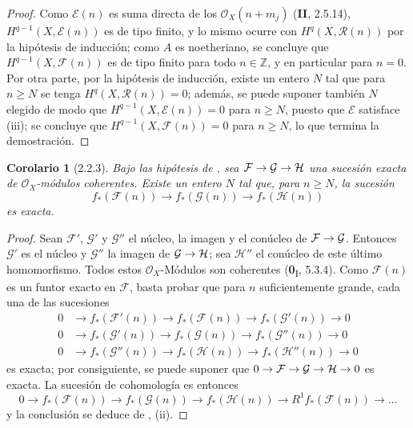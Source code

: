 \documentclass[10pt,oneside,openany]{book}
\theoremstyle{egaenv}\newtheorem*{env}{---}
\theoremstyle{egastatement}
\newtheorem*{corollary}{Corolario}
\theoremstyle{egadescription}
\renewcommand{\geq}{\geqslant}
\renewcommand{\to}{\mathchoice{\longrightarrow}{\rightarrow}{\rightarrow}{\rightarrow}}
\begin{document}
\begin{proof}
Como $\mathcal E(n)$ es suma directa de los $\mathcal O_X(n+m_j)$ (\textbf{II}, 2.5.14), $H^{q-1}(X,\mathcal E(n))$ es de tipo finito, y lo mismo ocurre con $H^q(X,\mathcal R(n))$ por la hipótesis de inducción; como $A$ es noetheriano, se concluye que $H^{q-1}(X,\mathcal F(n))$ es de tipo finito para todo $n\in\mathbb Z$, y en particular para $n=0$. Por otra parte, por la hipótesis de inducción, existe un entero $N$ tal que para $n\geq N$ se tenga $H^q(X,\mathcal R(n))=0$; además, se puede suponer también $N$ elegido de modo que $H^{q-1}(X,\mathcal E(n))=0$ para $n\geq N$, puesto que $\mathcal E$ satisface (iii); se concluye que $H^{q-1}(X,\mathcal F(n))=0$ para $n\geq N$, lo que termina la demostración.
\end{proof}

\begin{corollary}[2.2.3]
\label{III.2.2.3}
\label{III.2.2.3-fr}
Bajo las hipótesis de \textup{}, sea
$\mathcal F\to\mathcal G\to\mathcal H$
una sucesión exacta de $\mathcal O_X$-módulos coherentes.
Existe un entero $N$ tal que, para $n\geq N$, la sucesión
\[
f_*(\mathcal F(n))\longrightarrow f_*(\mathcal G(n))
\longrightarrow f_*(\mathcal H(n))
\]
es exacta.
\end{corollary}

\begin{proof}
Sean $\mathcal F'$, $\mathcal G'$ y $\mathcal G''$ el núcleo, la imagen y el conúcleo de $\mathcal F\to\mathcal G$.
Entonces $\mathcal G'$ es el núcleo y $\mathcal G''$ la imagen de $\mathcal G\to\mathcal H$; sea $\mathcal H''$ el conúcleo de este último homomorfismo.
Todos estos $\mathcal O_X$-Módulos son
coherentes (\textbf{0}\textsubscript{I}, 5.3.4). Como $\mathcal F(n)$ es un
funtor exacto en $\mathcal F$, basta probar que para $n$ suficientemente grande, cada una de las sucesiones
\begin{align*}
0&\longrightarrow f_*(\mathcal F'(n))
\longrightarrow f_*(\mathcal F(n))
\longrightarrow f_*(\mathcal G'(n))\longrightarrow0\\
0&\longrightarrow f_*(\mathcal G'(n))
\longrightarrow f_*(\mathcal G(n))
\longrightarrow f_*(\mathcal G''(n))\longrightarrow0\\
0&\longrightarrow f_*(\mathcal G''(n))
\longrightarrow f_*(\mathcal H(n))
\longrightarrow f_*(\mathcal H''(n))\longrightarrow0
\end{align*} es exacta; por consiguiente, se puede suponer que $0\to\mathcal F\to\mathcal G\to\mathcal H\to0$
es exacta.
La sucesión de cohomología es entonces
\[
0\longrightarrow f_*(\mathcal F(n))
\longrightarrow f_*(\mathcal G(n))
\longrightarrow f_*(\mathcal H(n))
\longrightarrow R^1f_*(\mathcal F(n))\longrightarrow\ldots
\]
y la conclusión se deduce de , (ii).
\end{proof}
\end{document}
